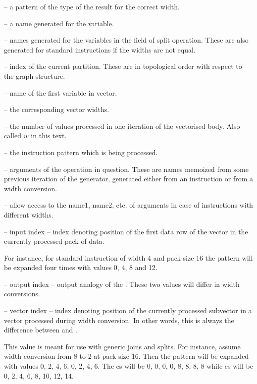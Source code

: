 \begin{description}
\item{} -- a pattern of the type of the result for the correct width.
\item{} -- a name generated for the variable.
\item{} -- names generated for the variables in the  field of split operation. These are also generated for standard instructions if the widths are not equal.
\item{} -- index of the current partition. These are in topological order with respect to the graph structure.
\item{}  -- name of the first variable in vector. 
\item{}  -- the corresponding vector widths.
\item{}  -- the number of values processed in one iteration of the vectorised body. Also called $w$ in this text.
\item{} -- the instruction pattern which is being processed.
\item{} -- arguments of the operation in question. These are names memoized from some previous iteration of the generator, generated either from an instruction or from a width conversion.
\item{} -- allow access to the name1, name2, etc. of arguments in case of instructions with different widths.
\item{} -- input index -- index denoting position of the first data row of the vector in the currently processed pack of data. 

  For instance, for standard instruction of width 4 and pack size 16 the pattern will be expanded four times with values  0, 4, 8 and 12.

\item{} -- output index -- output analogy of the . These two values will differ in width conversions.


\item{} -- vector index -- index denoting position of the currently processed subvector in a vector processed during width conversion. In other words, this is always the difference between  and .

This value is meant for use with generic joins and splits. For instance, assume width conversion from 8 to 2 at pack size 16. Then the  pattern will be expanded with values 0, 2, 4, 6, 0, 2, 4, 6. The es will be 0, 0, 0, 0, 8, 8, 8, 8 while es will be 0, 2, 4, 6, 8, 10, 12, 14.
\end{description}


